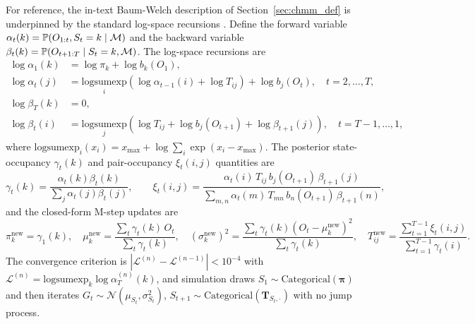 For reference, the in-text Baum-Welch description of Section~\ref{sec:chmm_def} is underpinned by the standard log-space recursions \cite{rabiner1986introduction, bilmes1998gentle}.
Define the forward variable $\alpha_t(k) = \mathbb{P}(O_{1:t}, S_t = k \mid \mathcal{M})$ and the backward variable $\beta_t(k) = \mathbb{P}(O_{t+1:T} \mid S_t = k, \mathcal{M})$.
The log-space recursions are
\begin{align}
    \log \alpha_1(k) &= \log \pi_k + \log b_k(O_1), \label{eq:forward_init} \\
    \log \alpha_t(j) &= \underset{i}{\text{logsumexp}}\!\left(\log \alpha_{t-1}(i) + \log T_{ij}\right) + \log b_j(O_t), \quad t = 2, \ldots, T, \label{eq:forward} \\[4pt]
    \log \beta_T(k) &= 0, \label{eq:backward_init} \\
    \log \beta_t(i) &= \underset{j}{\text{logsumexp}}\!\left(\log T_{ij} + \log b_j(O_{t+1}) + \log \beta_{t+1}(j)\right), \quad t = T{-}1, \ldots, 1, \label{eq:backward}
\end{align}
where $\text{logsumexp}_i(x_i) = x_{\max} + \log \sum_i \exp(x_i - x_{\max})$.
The posterior state-occupancy $\gamma_t(k)$ and pair-occupancy $\xi_t(i, j)$ quantities are
\begin{equation}
    \gamma_t(k) = \frac{\alpha_t(k) \beta_t(k)}{\sum_j \alpha_t(j) \beta_t(j)}, \qquad
    \xi_t(i, j) = \frac{\alpha_t(i)\, T_{ij}\, b_j(O_{t+1})\, \beta_{t+1}(j)}{\sum_{m,n} \alpha_t(m)\, T_{mn}\, b_n(O_{t+1})\, \beta_{t+1}(n)},
    \label{eq:gamma_xi}
\end{equation}
and the closed-form M-step updates are
\begin{equation}
    \pi_k^{\text{new}} = \gamma_1(k),\quad
    \mu_k^{\text{new}} = \frac{\sum_t \gamma_t(k)\, O_t}{\sum_t \gamma_t(k)},\quad
    \left(\sigma_k^{\text{new}}\right)^2 = \frac{\sum_t \gamma_t(k)(O_t - \mu_k^{\text{new}})^2}{\sum_t \gamma_t(k)},\quad
    T_{ij}^{\text{new}} = \frac{\sum_{t=1}^{T-1} \xi_t(i, j)}{\sum_{t=1}^{T-1} \gamma_t(i)}.
    \label{eq:mstep}
\end{equation}
The convergence criterion is $|\mathcal{L}^{(n)} - \mathcal{L}^{(n-1)}| < 10^{-4}$ with $\mathcal{L}^{(n)} = \text{logsumexp}_k \log \alpha_T^{(n)}(k)$, and simulation draws $S_1 \sim \text{Categorical}(\boldsymbol{\pi})$ and then iterates $G_t \sim \mathcal{N}(\mu_{S_t}, \sigma_{S_t}^2)$, $S_{t+1} \sim \text{Categorical}(\mathbf{T}_{S_t, \cdot})$ with no jump process.

